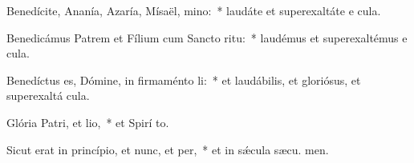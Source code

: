 \item Benedícite, Ananía, Azaría, Mísaël, mino:~* laudáte et superexaltáte e  cula.
\item Benedicámus Patrem et Fílium cum Sancto ritu:~* laudémus et superexaltémus e  cula.
\item Benedíctus es, Dómine, in firmaménto li:~* et laudábilis, et gloriósus, et superexaltá  cula.
\item Glória Patri, et lio,~* et Spirí to.
\item Sicut erat in princípio, et nunc, et per,~* et in sǽcula sæcu. men.
